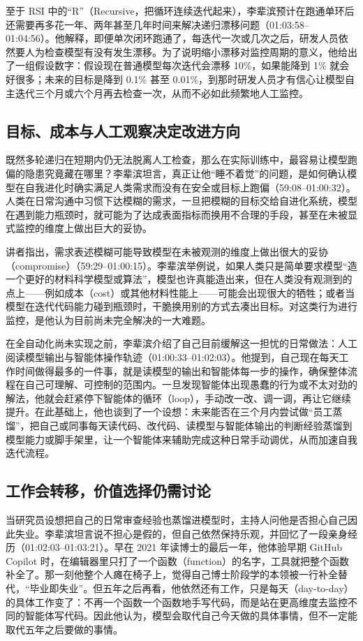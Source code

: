 \documentclass[UTF8,a4paper,11pt,fontset=fandol]{ctexart}
\begin{document}
至于 RSI 中的“R”（Recursive，把循环连续迭代起来），李辈滨预计在跑通单环后还需要再多花一年、两年甚至几年时间来解决递归漂移问题（01:03:58–01:04:56）。他解释，即便单次闭环跑通了，每迭代一次或几次之后，研发人员依然要人为检查模型有没有发生漂移。为了说明缩小漂移对监控周期的意义，他给出了一组假设数字：假设现在普通模型每次迭代会漂移 10\%，如果能降到 1\% 就会好很多；未来的目标是降到 0.1\% 甚至 0.01\%，到那时研发人员才有信心让模型自主迭代三个月或六个月再去检查一次，从而不必如此频繁地人工监控。

\subsection{目标、成本与人工观察决定改进方向}
既然多轮递归在短期内仍无法脱离人工检查，那么在实际训练中，最容易让模型跑偏的隐患究竟藏在哪里？李辈滨坦言，真正让他“睡不着觉”的问题，是如何确认模型在自我进化时确实满足人类需求而没有在安全或目标上跑偏（59:08–01:00:32）。人类在日常沟通中习惯下达模糊的需求，一旦把模糊的目标交给自进化系统，模型在遇到能力瓶颈时，就可能为了达成表面指标而换用不合理的手段，甚至在未被显式监控的维度上做出巨大的妥协。

讲者指出，需求表述模糊可能导致模型在未被观测的维度上做出很大的妥协（compromise）（59:29–01:00:15）。李辈滨举例说，如果人类只是简单要求模型“造一个更好的材料科学模型或算法”，模型也许真能造出来，但在人类没有观测到的点上——例如成本（cost）或其他材料性能上——可能会出现很大的牺牲；或者当模型在迭代代码能力碰到瓶颈时，干脆换用别的方式去凑出目标。对这类行为进行监控，是他认为目前尚未完全解决的一大难题。

在全自动化尚未实现之前，李辈滨介绍了自己目前缓解这一担忧的日常做法：人工阅读模型输出与智能体操作轨迹（01:00:33–01:02:03）。他提到，自己现在每天工作时间做得最多的一件事，就是读模型的输出和智能体每一步的操作，确保整体流程在自己可理解、可控制的范围内。一旦发现智能体出现愚蠢的行为或不太对劲的解法，他就会赶紧停下智能体的循环（loop），手动改一改、调一调，再让它继续提升。在此基础上，他也谈到了一个设想：未来能否在三个月内尝试做“员工蒸馏”，把自己或同事每天读代码、改代码、读模型与智能体输出的判断经验蒸馏到模型能力或脚手架里，让一个智能体来辅助完成这种日常手动调优，从而加速自我迭代流程。

\subsection{工作会转移，价值选择仍需讨论}
当研究员设想把自己的日常审查经验也蒸馏进模型时，主持人问他是否担心自己因此失业。李辈滨坦言说不担心是假的，但自己依然保持乐观，并回忆了一段亲身经历（01:02:03–01:03:21）。早在 2021 年读博士的最后一年，他体验早期 GitHub Copilot 时，在编辑器里只打了一个函数（function）的名字，工具就把整个函数补全了。那一刻他整个人瘫在椅子上，觉得自己博士阶段学的本领被一行补全替代，“毕业即失业”。但五年之后再看，他依然还有工作，只是每天（day-to-day）的具体工作变了：不再一个函数一个函数地手写代码，而是站在更高维度去监控不同的智能体写代码。因此他认为，模型会取代自己今天做的具体事情，但不一定能取代五年之后要做的事情。
\end{document}
